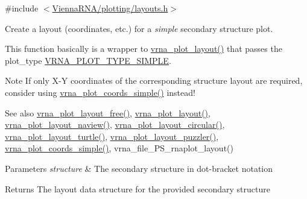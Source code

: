 {\ttfamily \#include $<$\mbox{\hyperlink{layouts_8h}{Vienna\+R\+N\+A/plotting/layouts.\+h}}$>$}



Create a layout (coordinates, etc.) for a {\itshape simple} secondary structure plot. 

This function basically is a wrapper to \mbox{\hyperlink{group__plot__layout__utils_ga7953b759eada86c61b0a4aebe0dc67d1}{vrna\+\_\+plot\+\_\+layout()}} that passes the {\ttfamily plot\+\_\+type} \mbox{\hyperlink{group__plot__layout__utils_gae6d17b9f0a53cf5205a9181e0f8422e9}{V\+R\+N\+A\+\_\+\+P\+L\+O\+T\+\_\+\+T\+Y\+P\+E\+\_\+\+S\+I\+M\+P\+LE}}.

\begin{DoxyNote}{Note}
If only X-\/Y coordinates of the corresponding structure layout are required, consider using \mbox{\hyperlink{group__plot__layout__utils_gaea0dada4d0113d16d4890bc0937292e6}{vrna\+\_\+plot\+\_\+coords\+\_\+simple()}} instead!
\end{DoxyNote}
\begin{DoxySeeAlso}{See also}
\mbox{\hyperlink{group__plot__layout__utils_ga996128730020a2d7a7368b4248195931}{vrna\+\_\+plot\+\_\+layout\+\_\+free()}}, \mbox{\hyperlink{group__plot__layout__utils_ga7953b759eada86c61b0a4aebe0dc67d1}{vrna\+\_\+plot\+\_\+layout()}}, \mbox{\hyperlink{group__plot__layout__utils_gab0e886afe200db9323e4e65d44738177}{vrna\+\_\+plot\+\_\+layout\+\_\+naview()}}, \mbox{\hyperlink{group__plot__layout__utils_ga41d94adbd42e1a570d840756e6dd6909}{vrna\+\_\+plot\+\_\+layout\+\_\+circular()}}, \mbox{\hyperlink{group__plot__layout__utils_ga4ecd3401e22933a44bf31d14320e59b1}{vrna\+\_\+plot\+\_\+layout\+\_\+turtle()}}, \mbox{\hyperlink{group__plot__layout__utils_ga57f815d56c8c083c016381213f581f1e}{vrna\+\_\+plot\+\_\+layout\+\_\+puzzler()}}, \mbox{\hyperlink{group__plot__layout__utils_gaea0dada4d0113d16d4890bc0937292e6}{vrna\+\_\+plot\+\_\+coords\+\_\+simple()}}, vrna\+\_\+file\+\_\+\+P\+S\+\_\+rnaplot\+\_\+layout()
\end{DoxySeeAlso}

\begin{DoxyParams}{Parameters}
{\em structure} & The secondary structure in dot-\/bracket notation \\
\hline
\end{DoxyParams}
\begin{DoxyReturn}{Returns}
The layout data structure for the provided secondary structure 
\end{DoxyReturn}
\mbox{\label{group__plot__layout__utils_gab0e886afe200db9323e4e65d44738177}} 
